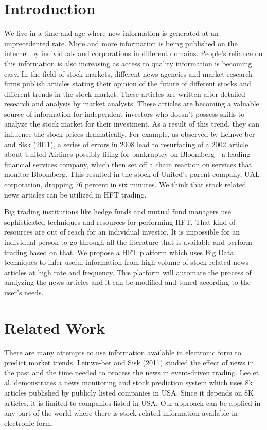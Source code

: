 \documentclass[a4paper,11pt]{article}
\begin{document}
\section{Introduction}
We live in a time and age where new information is generated at an unprecedented rate. More and more information is being published on the internet by individuals and corporations in different domains. People's reliance on this information is also increasing as access to quality information is becoming easy. In the field of stock markets, different news agencies and market research firms publish articles stating their opinion of the future of different stocks and different trends in the stock market. These articles are written after detailed research and analysis by market analysts. These articles are becoming a valuable source of information for independent investors who doesn't possess skills to analyze the stock market for their investment. As a result of this trend, they can influence the stock prices dramatically. For example, 
as observed by Leinwe-ber and Sisk (2011)\cite{leinwe}, a series of errors in 2008 lead to resurfacing of a 2002 article about United Airlines possibly filing for bankruptcy on Bloomberg - a leading financial services company, which then	set	off	a chain	reaction on	services that monitor Bloomberg. This resulted in the stock of United's parent company, UAL corporation, dropping 76 percent in six minutes. We think that stock related news articles can be utilized in HFT trading.
\par
Big trading institutions like hedge funds and mutual fund managers use sophisticated techniques and resources for performing HFT. That kind of resources are out of reach for an individual investor. It is impossible for an individual person to go through all the literature that is available and perform trading based on that. We propose a HFT platform which uses Big Data techniques to infer useful information from high volume of stock related news articles at high rate and frequency. This platform will automate the process of analyzing the news articles and it can be modified and tuned according to the user's needs.
\section{Related Work}
There are many attempts to use information available in electronic form to predict market trends. Leinwe-ber and Sisk (2011)\cite{leinwe} studied the effect of news in the past and the time needed to process the news in event-driven trading. Lee et al.\cite{lee} demonstrates a news monitoring and stock prediction system which uses 8k articles published by publicly listed companies in USA. Since it depends on 8K articles, it is limited to companies listed in USA. Our approach can be applied in any part of the world where there is stock related information available in electronic form.
\end{document}
